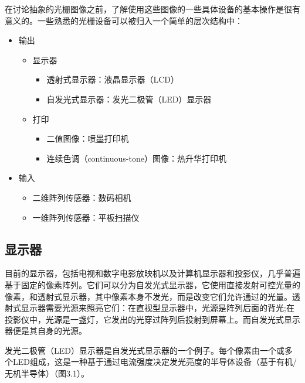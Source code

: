 \documentclass[lang=cn,12pt,marginpar=margintrue]{elegantbook}
\begin{document}
在讨论抽象的光栅图像之前，了解使用这些图像的一些具体设备的基本操作是很有意义的。一些熟悉的光栅设备可以被归入一个简单的层次结构中：

\begin{itemize}
  \item 输出
        \begin{itemize}
          \item 显示器
                \begin{itemize}
                  \item 透射式显示器：液晶显示器（LCD）
                  \item 自发光式显示器：发光二极管（LED）显示器
                \end{itemize}
          \item 打印
                \begin{itemize}
                  \item 二值图像：喷墨打印机
                  \item 连续色调（continuous-tone）图像：热升华打印机
                \end{itemize}
        \end{itemize}
  \item 输入
        \begin{itemize}
          \item 二维阵列传感器：数码相机
          \item 一维阵列传感器：平板扫描仪
        \end{itemize}
\end{itemize}

\subsection{显示器}

目前的显示器，包括电视和数字电影放映机以及计算机显示器和投影仪，几乎普遍基于固定的像素阵列。它们可以分为自发光式显示器，它使用直接发射可控光量的像素，和透射式显示器，其中像素本身不发光，而是改变它们允许通过的光量。透射式显示器需要光源来照亮它们：在直视型显示器中，光源是阵列后面的背光;在投影仪中，光源是一盏灯，它发出的光穿过阵列后投射到屏幕上。而自发光式显示器便是其自身的光源。


发光二极管（LED）显示器是自发光式显示器的一个例子。每个像素由一个或多个LED组成，这是一种基于通过电流强度决定发光亮度的半导体设备（基于有机/无机半导体）（图3.1）。
\end{document}
